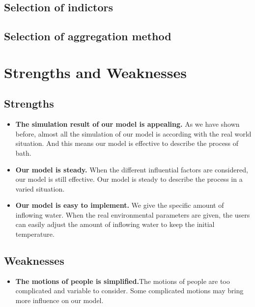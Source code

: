 \documentclass{mcmthesis}
\begin{document}
\subsection{Selection of indictors}%
\subsection{Selection of aggregation method}%
\section{Strengths and Weaknesses}
\subsection{Strengths}
\begin{itemize}
\item{\textbf{The simulation result of our model is appealing.} As we have shown before, almost all the simulation of our model is according with the real world situation. And this means our model is effective to describe the process of bath.}
\item{\textbf{Our model is steady.} When the different influential factors are considered, our model is still effective. Our model is steady to describe the process in a varied situation. }
\item{\textbf{Our model is easy to implement.} We give the specific amount of inflowing water. When the real environmental parameters are given, the users can easily adjust the amount of inflowing water to keep the initial temperature. }
\end{itemize}
\subsection{Weaknesses}
\begin{itemize}
\item{\textbf{The motions of people is simplified.}The motions of people are too complicated and variable to consider. Some complicated motions may bring more influence on our model. }
\end{itemize}
\end{document}
